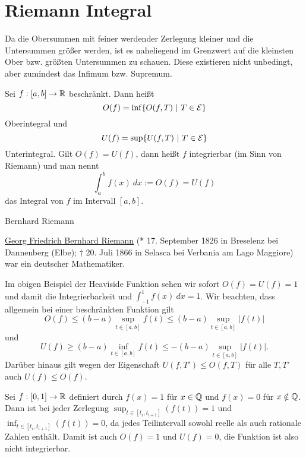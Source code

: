 \section{Riemann Integral}
\label{\detokenize{integration/riemann:riemann-integral}}\label{\detokenize{integration/riemann::doc}}
Da die Obersummen mit feiner werdender Zerlegung kleiner und die Untersummen größer werden, ist es naheliegend im Grenzwert auf die kleinsten Ober  bzw. größten Untersummen zu schauen. Diese existieren nicht unbedingt, aber zumindest das Infimum bzw. Supremum.
\label{integration/riemann:definition-0}
\begin{definition}{}{}



Sei \(f:[a,b] \rightarrow \mathbb{R}\) beschränkt. Dann heißt
\begin{equation*}
 O(f) = \inf\{ O(f,T)~|~ T \in {\cal E} \}\end{equation*}
Oberintegral und
\begin{equation*}
 U(f) =  \sup\{ U(f,T)~|~ T \in {\cal E} \}\end{equation*}
Unterintegral.
Gilt \(O(f) = U(f)\), dann heißt \(f\) integrierbar (im Sinn von Riemann) und man nennt
\begin{equation*}
 \int_a^b f(x)~dx := O(f) = U(f)
\end{equation*}
das Integral von \(f\) im Intervall \([a,b]\).
\end{definition}

\begin{emphBox}{Bernhard Riemann}{}

\href{https://de.wikipedia.org/wiki/Bernhard\_Riemann}{Georg Friedrich Bernhard Riemann} (* 17. September 1826 in Breselenz bei Dannenberg (Elbe); † 20. Juli 1866 in Selasca bei Verbania am Lago Maggiore) war ein deutscher Mathematiker.
\end{emphBox}

Im obigen Beispiel der Heaviside Funktion sehen wir sofort \(O(f)=U(f)=1\) und damit die Integrierbarkeit und
\(\int_{-1}^1 f(x)~dx = 1\).
Wir beachten, dass allgemein bei einer beschränkten Funktion gilt
\begin{equation*}
O(f) \leq (b-a) \sup_{t \in [a,b]}f(t) \leq  (b-a) \sup_{t \in [a,b]} \vert f(t) \vert
\end{equation*}
und
\begin{equation*}
U(f) \geq (b-a) \inf_{t \in [a,b]}f(t) \leq -  (b-a) \sup_{t \in [a,b]} \vert f(t) \vert .
\end{equation*}
Darüber hinaus gilt wegen der Eigenschaft \(U(f,T') \leq O(f,T)\) für alle \(T,T'\) auch \(U(f) \leq O(f)\).
\label{integration/riemann:example-1}
\begin{example}{}{}



Sei \(f:[0,1] \rightarrow \mathbb{R}\) definiert durch \(f(x) =1\) für \(x\in \mathbb{Q}\) und \(f(x)=0\) für \(x \notin \mathbb{Q}\). Dann ist bei jeder Zerlegung \(\sup_{t \in [t_i,t_{i+1}]}(f(t)) =1\) und \(\inf_{t \in [t_i,t_{i+1}]}(f(t))=0\), da jedes Teilintervall sowohl reelle als auch rationale Zahlen enthält. Damit ist auch \(O(f)=1\) und \(U(f) =0\), die Funktion ist also nicht integrierbar.
\end{example}

